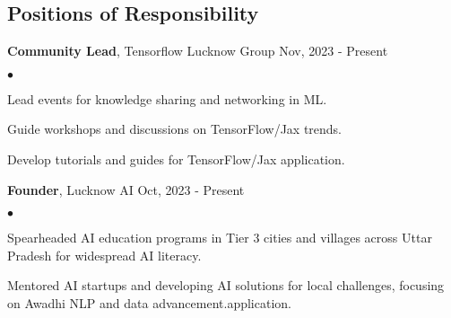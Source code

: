 \documentclass[margin,line]{res}
\newenvironment{list2}{
  \begin{list}{$\bullet$}{%
      \setlength{\itemsep}{0in}
      \setlength{\parsep}{0in} \setlength{\parskip}{0in}
      \setlength{\topsep}{0in} \setlength{\partopsep}{0in} 
      \setlength{\leftmargin}{0.2in}}}{\end{list}}
\begin{document}
\begin{resume}
\section{\sc Positions of Responsibility}
{\textbf{Community Lead}, Tensorflow Lucknow Group \hfill {Nov, 2023} - Present}\\
\begin{list2}
    \item Lead events for knowledge sharing and networking in ML.
    \item Guide workshops and discussions on TensorFlow/Jax trends.
    \item Develop tutorials and guides for TensorFlow/Jax application.
\end{list2}
{\textbf{Founder}, Lucknow AI \hfill {Oct, 2023} - Present}\\
\begin{list2}
     \item Spearheaded AI education programs in Tier 3 cities and villages across Uttar Pradesh for widespread AI literacy.
     \item Mentored AI startups and developing AI solutions for local challenges, focusing on Awadhi NLP and data advancement.application.
\end{list2}
\vspace*{.3cm}

\end{resume}
\end{document}
